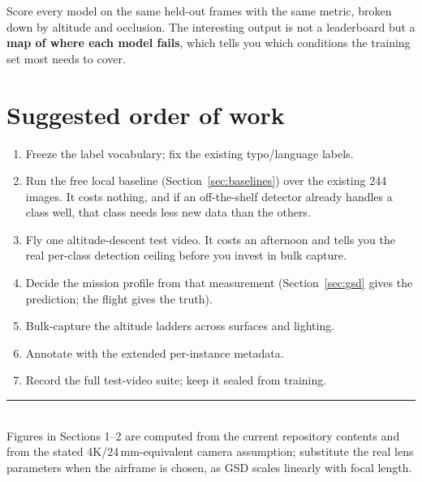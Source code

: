 \documentclass[11pt,a4paper]{article}
\begin{document}
\noindent Score every model on the same held-out frames with the same metric,
broken down by altitude and occlusion. The interesting output is not a
leaderboard but a \textbf{map of where each model fails}, which tells you which
conditions the training set most needs to cover.

\section{Suggested order of work}

\begin{enumerate}[leftmargin=*,itemsep=1pt]
\item Freeze the label vocabulary; fix the existing typo/language labels.
\item Run the free local baseline (Section~\ref{sec:baselines}) over the
existing 244 images. It costs nothing, and if an off-the-shelf detector already
handles a class well, that class needs less new data than the others.
\item Fly one altitude-descent test video. It costs an afternoon and tells you
the real per-class detection ceiling before you invest in bulk capture.
\item Decide the mission profile from that measurement (Section~\ref{sec:gsd}
gives the prediction; the flight gives the truth).
\item Bulk-capture the altitude ladders across surfaces and lighting.
\item Annotate with the extended per-instance metadata.
\item Record the full test-video suite; keep it sealed from training.
\end{enumerate}

\vspace{4mm}
\noindent\rule{\linewidth}{0.4pt}\\
{\small Figures in Sections 1--2 are computed from the current repository
contents and from the stated 4K/24\,mm-equivalent camera assumption; substitute
the real lens parameters when the airframe is chosen, as GSD scales linearly
with focal length.}
\end{document}

